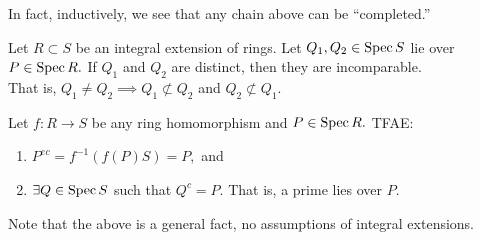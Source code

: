 \documentclass[12pt]{article}	%
\begin{document}
In fact, inductively, we see that any chain above can be ``completed.''

\begin{center}
\end{center}

\begin{prop}
	Let $R \subset S$ be an integral extension of rings. Let $Q_1, Q_2 \in \operatorname{Spec} S$ lie over $P \in \operatorname{Spec} R.$ If $Q_1$ and $Q_2$ are distinct, then they are incomparable. \\
	That is, $Q_1 \neq Q_2 \implies Q_1 \not\subset Q_2$ and $Q_2 \not\subset Q_1.$
\end{prop}
\begin{center}
\end{center}	

\begin{lem} 
	Let $f : R \to S$ be any ring homomorphism and $P \in \operatorname{Spec} R.$ TFAE:
	\begin{enumerate}
		\item $P^{ec} = f^{-1}(f(P)S) = P,$ and
		\item $\exists Q \in \operatorname{Spec} S$ such that $Q^c = P.$ That is, a prime lies over $P.$
	\end{enumerate}
\end{lem}
Note that the above is a general fact, no assumptions of integral extensions.
\end{document}
